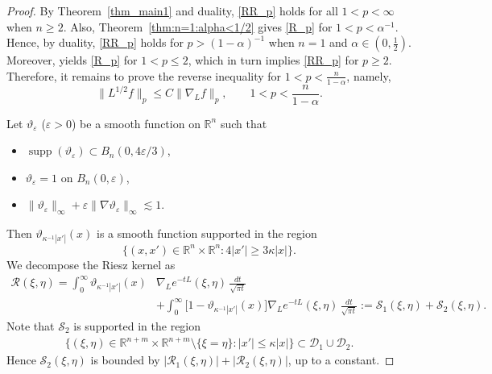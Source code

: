 \documentclass[12pt]{amsart}
\begin{document}
\begin{proof}
By Theorem~\ref{thm_main1} and duality, \eqref{RR_p} holds for all $1<p<\infty$ when $n\ge 2$. Also, Theorem~\ref{thm:n=1:alpha<1/2} gives \eqref{R_p} for $1<p<\alpha^{-1}$. Hence, by duality, \eqref{RR_p} holds for $p>(1-\alpha)^{-1}$ when $n=1$ and $\alpha\in (0,\frac{1}{2})$. Moreover, \cite[Theorem~8.1]{RS} yields \eqref{R_p} for $1<p\le 2$, which in turn implies \eqref{RR_p} for $p\ge 2$. Therefore, it remains to prove the reverse inequality for $1<p<\frac{n}{1-\alpha}$, namely,
\begin{equation*}
    \| L^{1/2}f\|_p \le C \| \nabla_L f\|_p,\qquad 1<p<\frac{n}{1-\alpha}.
\end{equation*}

Let $\vartheta_\varepsilon$ ($\varepsilon>0$) be a smooth function on $\mathbb{R}^n$ such that
\begin{itemize}
    \item $\operatorname{supp}(\vartheta_\varepsilon) \subset B_n(0,4 \varepsilon/3)$,
    \item $\vartheta_\varepsilon=1$ on $B_n(0,\varepsilon)$,
    \item $\|\vartheta_\varepsilon\|_\infty + \varepsilon \|\nabla \vartheta_\varepsilon\|_\infty \lesssim 1$.
\end{itemize}
Then $\vartheta_{\kappa^{-1} |x'|}(x)$ is a smooth function supported in the region
\begin{equation*}
    \{(x,x')\in \mathbb{R}^n \times \mathbb{R}^n : 4|x'|\ge 3\kappa |x|\}.
\end{equation*}
We decompose the Riesz kernel as
\begin{align}\label{eq_Grushin_1}
    \mathcal{R}(\xi,\eta) = \int_0^\infty \vartheta_{\kappa^{-1} |x'|}(x)& \nabla_L e^{-tL}(\xi,\eta) \, \frac{dt}{\sqrt{\pi t}} \nonumber\\
    &+ \int_0^\infty \bigl[1 - \vartheta_{\kappa^{-1} |x'|}(x) \bigr] \nabla_L e^{-tL}(\xi,\eta) \, \frac{dt}{\sqrt{\pi t}}
    := \mathcal{S}_1(\xi,\eta) + \mathcal{S}_2(\xi,\eta).
\end{align}
Note that $\mathcal{S}_2$ is supported in the region
\begin{align*}
    \{(\xi,\eta)\in \mathbb{R}^{n+m}\times \mathbb{R}^{n+m} \setminus \{\xi=\eta\}: |x'|\le \kappa |x|\} \subset \mathcal{D}_1 \cup \mathcal{D}_2.
\end{align*}
Hence $\mathcal{S}_2(\xi,\eta)$ is bounded by $|\mathcal{R}_1(\xi,\eta)| + |\mathcal{R}_2(\xi,\eta)|$, up to a constant.


\end{proof}
\end{document}
